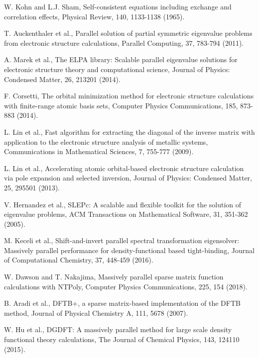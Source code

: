 \documentclass{report}
\begin{document}
\begin{thebibliography}{9}
W. Kohn and L.J. Sham, Self-consistent equations including exchange and correlation effects, Physical Review, 140, 1133-1138 (1965).

T. Auckenthaler et al., Parallel solution of partial symmetric eigenvalue problems from electronic structure calculations, Parallel Computing, 37, 783-794 (2011).

A. Marek et al., The ELPA library: Scalable parallel eigenvalue solutions for electronic structure theory and computational science, Journal of Physics: Condensed Matter, 26, 213201 (2014).

F. Corsetti, The orbital minimization method for electronic structure calculations with finite-range atomic basis sets, Computer Physics Communications, 185, 873-883 (2014).

L. Lin et al., Fast algorithm for extracting the diagonal of the inverse matrix with application to the electronic structure analysis of metallic systems, Communications in Mathematical Sciences, 7, 755-777 (2009).

L. Lin et al., Accelerating atomic orbital-based electronic structure calculation via pole expansion and selected inversion, Journal of Physics: Condensed Matter, 25, 295501 (2013).

V. Hernandez et al., SLEPc: A scalable and flexible toolkit for the solution of eigenvalue problems,
ACM Transactions on Mathematical Software, 31, 351-362 (2005).

M. Keceli et al., Shift-and-invert parallel spectral transformation eigensolver: Massively parallel performance for density-functional based tight-binding, Journal of Computational Chemistry, 37, 448-459 (2016).

W. Dawson and T. Nakajima, Massively parallel sparse matrix function calculations with NTPoly, Computer Physics Communications, 225, 154 (2018).

B. Aradi et al., DFTB+, a sparse matrix-based implementation of the DFTB method, Journal of Physical Chemistry A, 111, 5678 (2007).

W. Hu et al., DGDFT: A massively parallel method for large scale density functional theory calculations, The Journal of Chemical Physics, 143, 124110 (2015).


\end{thebibliography}
\end{document}
